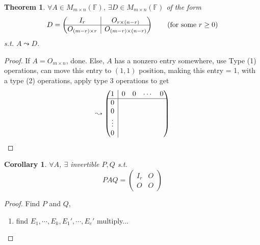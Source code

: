 \documentclass[12pt]{article}
\newtheorem{theorem}{Theorem}[subsection]
\newtheorem{corollary}{Corollary}[subsection]
\newcommand{\mF}{{\mathbb{F}}}
\newcommand{\rvline}{\hspace*{-\arraycolsep}\vline\hspace*{-\arraycolsep}}
\begin{document}
	\begin{theorem}
		$\forall A \in M_{m\times n} (\mF)$, $\exists D \in M_{m\times n}(\mF)$
		of the form
		\[
			D = 
			\begin{pmatrix}
				I_r & \rvline & O_{r \times (n-r)} \\ \hline
				O_{(m-r)\times r} & \rvline & O _{(m-r)\times(n-r)} 
			\end{pmatrix}
			\qquad (\text{for some } r\geq 0)
		\]
		s.t. $A \leadsto D$. 
	\end{theorem}
	\begin{proof}
		If $A = O_{m\times n}$, done. Else, $A$ has a nonzero entry somewhere,
		use Type (1) operations, can move this entry to $(1, 1)$ position,
		making this entry = 1, with a type (2) operations, apply type 3 
		operations to get  
		\[
			\leadsto 
			\begin{pmatrix}
				1 & \rvline & 0 & 0 & \cdots & 0\\ \hline
				0 & \rvline \\
				0 & \rvline \\
				\vdots & \rvline\\
				0 & \rvline\\
			\end{pmatrix}
		\]
		
	\end{proof}

	\begin{corollary}
		$\forall A$, $\exists$ invertible $P, Q$ s.t. 
		\[
			PAQ =
			\begin{pmatrix}
				I_r & O \\
				O & O
			\end{pmatrix}
		\]
	\end{corollary}
	\begin{proof}
		Find $P$ and $Q$, 
		\begin{enumerate}
			\item find $E_1, \cdots, E_k, E_1', \cdots, E_e'$ multiply...
		\end{enumerate}
	\end{proof}

\newpage
\end{document}
